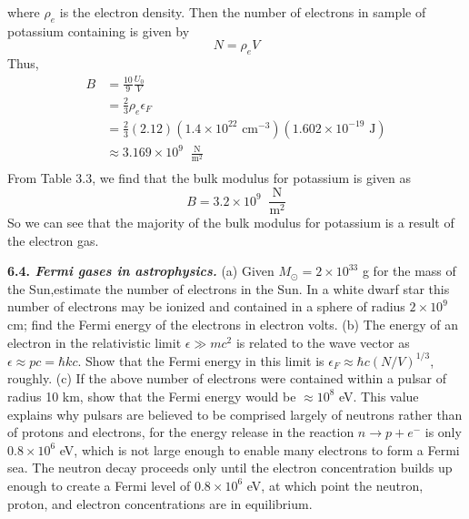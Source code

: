 \documentclass{article}
\begin{document}
\begin{itemize}
    where $\rho_e$ is the electron density. Then the number of electrons in sample of potassium containing is given by
    \[N = \rho_eV\]
    Thus, 
    \begin{align*}
        B &= \frac{10}{9}\frac{U_0}{V} \\
        &= \frac{2}{3}\rho_e\epsilon_F \\
        &= \frac{2}{3}(2.12)(1.4\times 10^{22} \text{ cm}^{-3})(1.602\times 10^{-19}\text{ J}) \\
        &\approx 3.169 \times 10^9 \;\;\frac{\text{N}}{\text{m}^2} \\
    \end{align*}
    From Table 3.3, we find that the bulk modulus for potassium is given as
    \[B = 3.2 \times 10^9 \;\; \frac{\text{N}}{\text{m}^2}\]
    So we can see that the majority of the bulk modulus for potassium is a result of the electron gas.
    
    
\end{itemize}

\textbf{6.4. \textit{Fermi gases in astrophysics.}} (a) Given $M_{\odot} = 2\times 10^{33}$ g for the mass of the Sun,estimate the number of electrons in the Sun. In a white dwarf star this number of electrons may be ionized and contained in a sphere of radius $2 \times 10^9$ cm; find the Fermi energy of the electrons in electron volts. (b) The energy of an electron in the relativistic limit $\epsilon \gg mc^2$ is related to the wave vector as $\epsilon \approx pc = \hbar kc$. Show that the Fermi energy in this limit is $\epsilon_F \approx \hbar c(N/V)^{1/3}$, roughly. (c) If the above number of electrons were contained within a pulsar of radius 10 km, show that the Fermi energy would be $\approx 10^8$ eV. This value explains why pulsars are believed to be comprised largely of neutrons rather than of protons and electrons, for the energy release in the reaction $n \to p + e^{-}$ is only $0.8 \times 10^6$ eV, which is not large enough to enable many electrons to form a Fermi sea. The neutron decay proceeds only until the electron concentration builds up enough to create a Fermi level of $0.8 \times 10^6$ eV, at which point the neutron, proton, and electron concentrations are in equilibrium.
\end{document}
